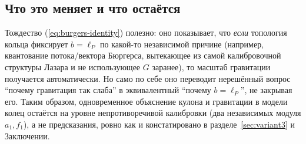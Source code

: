 \subsection{Что это меняет и что остаётся}

Тождество (\ref{eq:burgers-identity}) полезно: оно показывает, что
\emph{если} топология кольца фиксирует $b=\ell_P$ по какой-то
независимой причине (например, квантование потока/вектора Бюргерса,
вытекающее из самой калибровочной структуры Лазара и не использующее
$G$ заранее), то масштаб гравитации получается автоматически.
Но само по себе оно переводит нерешённый вопрос \enquote{почему
гравитация так слаба} в эквивалентный \enquote{почему $b=\ell_P$}, не
закрывая его. Таким образом, одновременное объяснение кулона и
гравитации в модели колец остаётся на уровне непротиворечивой
калибровки (два независимых модуля $a_1,f_1$), а не предсказания,
ровно как и констатировано в разделе~\ref{sec:variant3} и Заключении.
